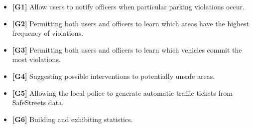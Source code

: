 \begin{itemize}

\item \textbf{[\hypertarget{G1}{G1}]} Allow users to notify officers when particular parking violations occur.

\item \textbf{[\hypertarget{G2}{G2}]} Permitting both users and officers to learn which areas have the highest frequency of violations.

\item \textbf{[\hypertarget{G3}{G3}]} Permitting both users and officers to learn which vehicles commit the most violations.

\item \textbf{[\hypertarget{G4}{G4}]} Suggesting possible interventions to potentially unsafe areas.

\item \textbf{[\hypertarget{G5}{G5}]} Allowing the local police to generate automatic traffic tickets from SafeStreets data.

\item \textbf{[\hypertarget{G6}{G6}]} Building and exhibiting statistics.

\end{itemize}